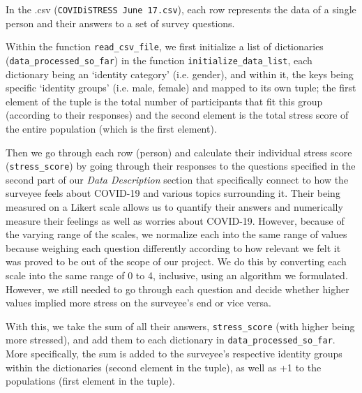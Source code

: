 \documentclass[fontsize=11pt]{article}
\begin{document}
    In the .csv (\texttt{COVIDiSTRESS June 17.csv}), each row represents the data of a single person and their answers to a set of survey questions.

    Within the function \texttt{read\_csv\_file}, we first initialize a list of dictionaries (\texttt{data\_processed\_so\_far}) in the function \texttt{initialize\_data\_list}, each dictionary being an ‘identity category’ (i.e. gender), and within it, the keys being specific ‘identity groups’ (i.e. male, female) and mapped to its own tuple; the first element of the tuple is the total number of participants that fit this group (according to their responses) and the second element is the total stress score of the entire population (which is the first element).

    Then we go through each row (person) and calculate their individual stress score (\texttt{stress\_score}) by going through their responses to the questions specified in the second part of our \textit{Data Description} section that specifically connect to how the surveyee feels about COVID-19 and various topics surrounding it. Their being measured on a Likert scale allows us to quantify their answers and numerically measure their feelings as well as worries about COVID-19.
    However, because of the varying range of the scales, we normalize each into the same range of values because weighing each question differently according to how relevant we felt it was proved to be out of the scope of our project. We do this by converting each scale into the same range of 0 to 4, inclusive, using an algorithm we formulated.
    However, we still needed to go through each question and decide whether higher values implied more stress on the surveyee's end or vice versa.

    With this, we take the sum of all their answers, \texttt{stress\_score} (with higher being more stressed), and add them to each dictionary in \texttt{data\_processed\_so\_far}. More specifically, the sum is added to the surveyee’s respective identity groups within the dictionaries (second element in the tuple), as well as +1 to the populations (first element in the tuple).
\end{document}
